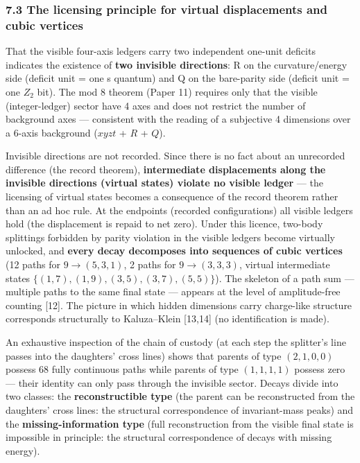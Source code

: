 \documentclass[
]{article}
\begin{document}
\subsubsection{7.3 The licensing principle for virtual displacements and
cubic
vertices}\label{the-licensing-principle-for-virtual-displacements-and-cubic-vertices}

That the visible four-axis ledgers carry two independent one-unit
deficits indicates the existence of \textbf{two invisible directions}: R
on the curvature/energy side (deficit unit = one s quantum) and Q on the
bare-parity side (deficit unit = one \(Z_2\) bit). The mod 8 theorem
(Paper 11) requires only that the visible (integer-ledger) sector have 4
axes and does not restrict the number of background axes --- consistent
with the reading of a subjective 4 dimensions over a 6-axis background
(\(xyzt\) + \(R\) + \(Q\)).

Invisible directions are not recorded. Since there is no fact about an
unrecorded difference (the record theorem), \textbf{intermediate
displacements along the invisible directions (virtual states) violate no
visible ledger} --- the licensing of virtual states becomes a
consequence of the record theorem rather than an ad hoc rule. At the
endpoints (recorded configurations) all visible ledgers hold (the
displacement is repaid to net zero). Under this licence, two-body
splittings forbidden by parity violation in the visible ledgers become
virtually unlocked, and \textbf{every decay decomposes into sequences of
cubic vertices} (12 paths for \(9\to(5,3,1)\), 2 paths for
\(9\to(3,3,3)\), virtual intermediate states
\(\{(1,7),(1,9),(3,5),(3,7),(5,5)\}\)). The skeleton of a path sum ---
multiple paths to the same final state --- appears at the level of
amplitude-free counting {[}12{]}. The picture in which hidden dimensions
carry charge-like structure corresponds structurally to Kaluza--Klein
{[}13,14{]} (no identification is made).

An exhaustive inspection of the chain of custody (at each step the
splitter's line passes into the daughters' cross lines) shows that
parents of type \((2,1,0,0)\) possess 68 fully continuous paths while
parents of type \((1,1,1,1)\) possess zero --- their identity can only
pass through the invisible sector. Decays divide into two classes: the
\textbf{reconstructible type} (the parent can be reconstructed from the
daughters' cross lines: the structural correspondence of invariant-mass
peaks) and the \textbf{missing-information type} (full reconstruction
from the visible final state is impossible in principle: the structural
correspondence of decays with missing energy).
\end{document}
